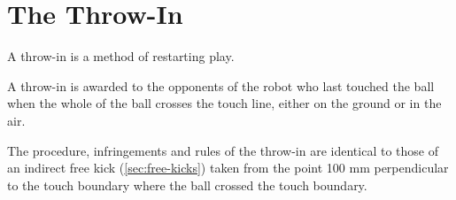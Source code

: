 \section{The Throw-In}\label{sec:throw-in}
A throw-in is a method of restarting play.

A throw-in is awarded to the opponents of the robot who last touched the ball when the whole of the
ball crosses the touch line, either on the ground or in the air.

The procedure, infringements and rules of the throw-in are identical to those of an indirect free
kick (\autoref{sec:free-kicks}) taken from the point 100 mm perpendicular to the touch boundary
where the ball crossed the touch boundary.


